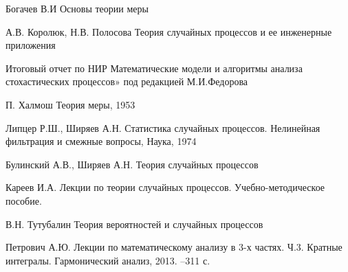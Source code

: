 \begin{thebibliography}{}
	 Богачев В.И Основы теории меры
	
	  А.В. Королюк, Н.В. Полосова Теория случайных процессов и ее инженерные приложения
	
	 Итоговый отчет по НИР Математические модели и алгоритмы анализа стохастических процессов» под редакцией М.И.Федорова
	
	 П. Халмош Теория меры, 1953
	
	 Липцер Р.Ш., Ширяев А.Н. Статистика случайных процессов. Нелинейная фильтрация и смежные вопросы, Наука, 1974
	
	 Булинский А.В., Ширяев А.Н. Теория случайных процессов
	
	 Кареев И.А. Лекции по теории случайных процессов. Учебно-методическое пособие.
	
	 В.Н. Тутубалин Теория вероятностей и случайных процессов
	
	   Петрович А.Ю. Лекции по математическому анализу в 3-х частях. Ч.3. Кратные интегралы. Гармонический анализ, 2013. --311 с.
	
	
\end{thebibliography}

